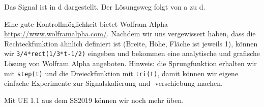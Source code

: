 \begin{Loesung}
Das Signal ist in d dargestellt. Der Lösungsweg folgt von
a zu d.

Eine gute Kontrollmöglichkeit bietet Wolfram Alpha
\url{https://www.wolframalpha.com/}.
Nachdem wir uns vergewissert haben, dass die Rechteckfunktion ähnlich definiert
ist (Breite, Höhe, Fläche ist jeweils 1), können wir
\verb|3/4*rect(1/3*t-1/2)| eingeben und bekommen eine analytische und grafische
Lösung von Wolfram Alpha angeboten.
Hinweis: die Sprungfunktion erhalten wir mit \verb|step(t)|
und die Dreieckfunktion mit \verb|tri(t)|, damit können wir eigene einfache
Experimente zur Signalskalierung und -verschiebung machen.

Mit UE 1.1 aus dem SS2019 können wir noch mehr üben.
\end{Loesung}

